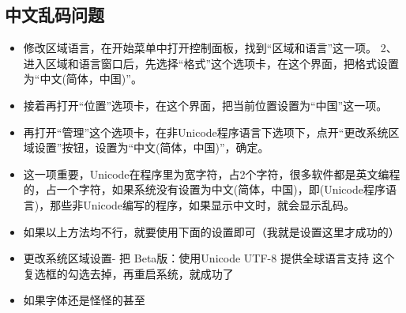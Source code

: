 \subsection{中文乱码问题}
\begin{itemize}
\item 修改区域语言，在开始菜单中打开控制面板，找到“区域和语言”这一项。
2、进入区域和语言窗口后，先选择“格式”这个选项卡，在这个界面，把格式设置为“中文(简体，中国)”。
\item 接着再打开“位置”选项卡，在这个界面，把当前位置设置为“中国”这一项。
\item 再打开“管理”这个选项卡，在非Unicode程序语言下选项下，点开“更改系统区域设置”按钮，设置为“中文(简体，中国)”，确定。
\item 这一项重要，Unicode在程序里为宽字符，占2个字符，很多软件都是英文编程的，占一个字符，如果系统没有设置为中文(简体，中国)，即(Unicode程序语言)，那些非Unicode编写的程序，如果显示中文时，就会显示乱码。
\item 如果以上方法均不行，就要使用下面的设置即可（我就是设置这里才成功的）
\item 更改系统区域设置- 把 Beta版：使用Unicode UTF-8 提供全球语言支持 这个复选框的勾选去掉，再重启系统，就成功了
\item 如果字体还是怪怪的甚至
\end{itemize}
